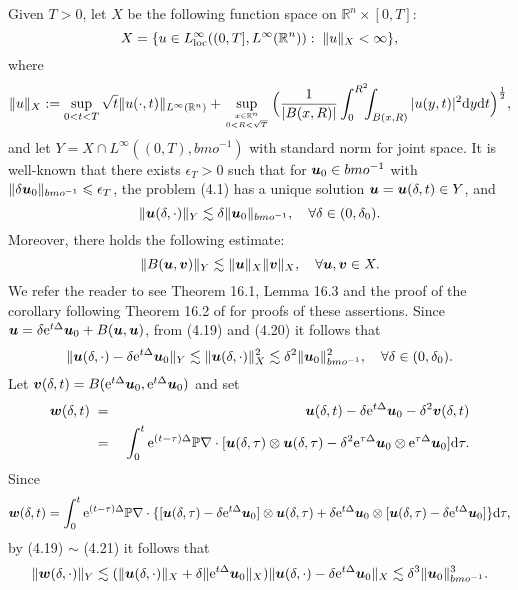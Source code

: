 \documentclass[11pt]{article}
\newcommand{\rmd}{\mbox{\rm d}}
\newcommand{\bfu}{{\mbox{\boldmath $u$}}}
\newcommand{\bfv}{{\mbox{\boldmath $v$}}}
\newcommand{\bfw}{{\mbox{\boldmath $w$}}}
\newcommand{\rme}{{\rm e}}
\begin{document}
  Given $T>0$, let $X$ be the following function space on $\mathbb{R}^n\times [0,T]$:
$$
  X=\{u\in L^{\infty}_{\rm loc}((0,T],L^{\infty}(\mathbb{R}^n)):\; \|u\|_X<\infty\},
$$
  where
$$
  \|u\|_X:=\sup_{0<t<T}\sqrt{t}\|u(\cdot,t)\|_{L^{\infty}(\mathbb{R}^n)}+\sup_{{x\in\mathbb{R}^n\atop 0<R<\sqrt{T}}}
  \Big(\frac{1}{|B(x,R)|}\int_0^{R^2}\!\!\!\int_{B(x,R)}|u(y,t)|^2\rmd y\rmd t\Big)^{\frac{1}{2}},
$$
  and let $Y=X\cap L^{\infty}((0,T),bmo^{-1})$ with standard norm for joint space. It is well-known that there exists $\epsilon_T>0$ such that for
  $\bfu_0\in bmo^{-1}$ with $\|\delta\bfu_0\|_{bmo^{-1}}\leqslant \epsilon_T$, the problem (4.1) has a unique solution $\bfu=\bfu(\delta,t)\in Y$, and
\begin{equation}
  \|\bfu(\delta,\cdot)\|_Y\lesssim\delta\|\bfu_0\|_{bmo^{-1}}, \quad \forall\delta\in (0,\delta_0).
\end{equation}
  Moreover, there holds the following estimate:
\begin{equation}
  \|B(\bfu,\bfv)\|_Y\lesssim\|\bfu\|_X\|\bfv\|_X, \quad \forall\bfu,\bfv\in X.
\end{equation}
  We refer the reader to see Theorem 16.1, Lemma 16.3 and the proof of the corollary following Theorem 16.2 of \cite{LEM02} for proofs of these
  assertions. Since $\bfu=\delta\rme^{t\Delta}\bfu_0+B(\bfu,\bfu)$, from (4.19) and (4.20) it follows that
\begin{equation}
  \|\bfu(\delta,\cdot)-\delta\rme^{t\Delta}\bfu_0\|_Y\lesssim\|\bfu(\delta,\cdot)\|_X^2\lesssim\delta^2\|\bfu_0\|_{bmo^{-1}}^2,
  \quad \forall\delta\in (0,\delta_0).
\end{equation}
  Let $\bfv(\delta,t)=B(\rme^{t\Delta}\bfu_0,\rme^{t\Delta}\bfu_0)$ and set
\begin{eqnarray*}
  \bfw(\delta,t)&\;=\;&\bfu(\delta,t)-\delta\rme^{t\Delta}\bfu_0-\delta^2\bfv(\delta,t)
\\
  &\;=\;&\int_0^t\rme^{(t-\tau)\Delta}\mathbb{P}\nabla\cdot[\bfu(\delta,\tau)\otimes\bfu(\delta,\tau)
  -\delta^2\rme^{\tau\Delta}\bfu_0\otimes\rme^{\tau\Delta}\bfu_0]\rmd\tau.
\end{eqnarray*}
  Since
$$
  \bfw(\delta,t)=\int_0^t\rme^{(t-\tau)\Delta}\mathbb{P}\nabla\cdot\{[\bfu(\delta,\tau)-\delta\rme^{t\Delta}\bfu_0]\otimes\bfu(\delta,\tau)
  +\delta\rme^{t\Delta}\bfu_0\otimes[\bfu(\delta,\tau)-\delta\rme^{t\Delta}\bfu_0]\}\rmd\tau,
$$
  by (4.19) $\sim$ (4.21) it follows that
\begin{equation}
  \|\bfw(\delta,\cdot)\|_Y\lesssim(\|\bfu(\delta,\cdot)\|_X+\delta\|\rme^{t\Delta}\bfu_0\|_X)
  \|\bfu(\delta,\cdot)-\delta\rme^{t\Delta}\bfu_0\|_X\lesssim\delta^3\|\bfu_0\|_{bmo^{-1}}^3.
\end{equation}
\end{document}
